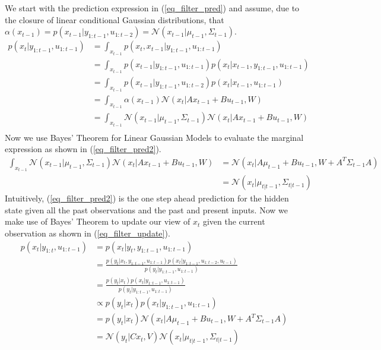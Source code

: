 \documentclass[../masters.tex]{subfiles}
\begin{document}
We start with the prediction expression in (\ref{eq_filter_pred}) and assume, due to the closure of linear conditional Gaussian distributions, that $\alpha(x_{t-1}) = p(x_{t-1}|y_{1:t-1}, u_{1:t-2}) = \mathcal{N}(x_{t-1}|\mu_{t-1}, \Sigma_{t-1}) $. 
\begin{equation}
\begin{aligned}
p(x_t|y_{1:t-1}, u_{1:t-1}) &= \int_{x_{t-1}} p(x_t,x_{t-1}|y_{1:t-1}, u_{1:t-1}) \\
&= \int_{x_{t-1}} p(x_{t-1}|y_{1:t-1}, u_{1:t-1})p(x_{t}|x_{t-1}, y_{1:t-1}, u_{1:t-1}) \\
&= \int_{x_{t-1}} p(x_{t-1}|y_{1:t-1}, u_{1:t-2})p(x_{t}|x_{t-1}, u_{1:t-1}) \\
&= \int_{x_{t-1}} \alpha(x_{t-1})\mathcal{N}(x_{t}|Ax_{t-1}+Bu_{t-1}, W) \\
&= \int_{x_{t-1}} \mathcal{N}(x_{t-1}|\mu_{t-1}, \Sigma_{t-1}) \mathcal{N}(x_{t}|Ax_{t-1}+Bu_{t-1}, W) \\
\end{aligned}
\label{eq_filter_pred}
\end{equation} 
Now we use Bayes' Theorem for Linear Gaussian Models to evaluate the marginal expression as shown in (\ref{eq_filter_pred2}).
\begin{equation}
\begin{aligned}
\int_{x_{t-1}} \mathcal{N}(x_{t-1}|\mu_{t-1}, \Sigma_{t-1}) \mathcal{N}(x_{t}|Ax_{t-1}+Bu_{t-1}, W) &= \mathcal{N}(x_t|A\mu_{t-1}+Bu_{t-1
}, W+ A^T\Sigma_{t-1}A) \\
&= \mathcal{N}(x_t|\mu_{t|t-1},\Sigma_{t|t-1})
\end{aligned}
\label{eq_filter_pred2}
\end{equation}
Intuitively, (\ref{eq_filter_pred2}) is the one step ahead prediction for the hidden state given all the past observations and the past and present inputs. Now we make use of Bayes' Theorem to update our view of $x_t$ given the current observation as shown in (\ref{eq_filter_update}).
\begin{equation}
\begin{aligned}
p(x_t|y_{1:t},u_{1:t-1}) &= p(x_t|y_{t},y_{1:t-1},u_{1:t-1}) \\
&= \frac{p(y_t|x_t,y_{1:t-1},u_{1:t-1})p(x_t|y_{1:t-1},u_{1:t-2}, u_{t-1})}{p(y_t|y_{1:t-1},u_{1:t-1})} \\
&= \frac{p(y_t|x_t)p(x_t|y_{1:t-1},u_{1:t-1})}{p(y_t|y_{1:t-1},u_{1:t-1})} \\
&\propto p(y_t|x_t)p(x_t|y_{1:t-1},u_{1:t-1})\\
&= p(y_t|x_t)\mathcal{N}(x_t|A\mu_{t-1}+Bu_{t-1
}, W+ A^T\Sigma_{t-1}A) \\
&= \mathcal{N}(y_{t}|Cx_{t}, V)\mathcal{N}(x_t|\mu_{t|t-1},\Sigma_{t|t-1})
\end{aligned}
\label{eq_filter_update}
\end{equation}
\end{document}
